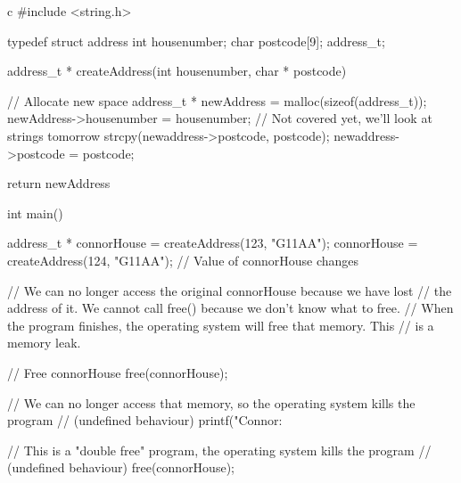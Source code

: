 \begin{code}{c}
    #include <string.h>

    typedef struct address {
        int housenumber;
        char postcode[9];
    } address_t;

    address_t * createAddress(int housenumber, char * postcode) {
        // Allocate new space
        address_t * newAddress = malloc(sizeof(address_t));
        newAddress->housenumber = housenumber;
        // Not covered yet, we'll look at strings tomorrow
        strcpy(newaddress->postcode, postcode);
        newaddress->postcode = postcode;

        return newAddress
    }

    int main() {
        address_t * connorHouse = createAddress(123, "G11AA");
        connorHouse = createAddress(124, "G11AA"); // Value of connorHouse changes

        // We can no longer access the original connorHouse because we have lost
        // the address of it. We cannot call free() because we don't know what to free. 
        // When the program finishes, the operating system will free that memory. This
        // is a memory leak.

        // Free connorHouse
        free(connorHouse);

        // We can no longer access that memory, so the operating system kills the program
        // (undefined behaviour)
        printf("Connor: %

        // This is a "double free" program, the operating system kills the program
        // (undefined behaviour)
        free(connorHouse);
    }
\end{code}

